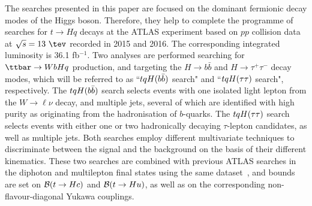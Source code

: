 
The searches presented in this paper are focused on the dominant fermionic decay modes of the Higgs boson.
Therefore, they help to complete the programme of searches for $t \to Hq$ decays at the ATLAS experiment based on $pp$ collision 
data at $\sqrt{s}=13~\tev$ recorded in 2015 and 2016. The corresponding integrated luminosity is 36.1 fb$^{-1}$.
Two analyses are performed searching for $\ttbar \to WbHq$ production, and targeting the $H \to b\bar{b}$ and $H \to \tau^+\tau^-$ decay modes, 
which will be referred to as ``$tqH(b\bar{b})$ search" and ``$tqH(\tau\tau)$ search", respectively.
The $tqH(b\bar{b})$ search selects events with one isolated light lepton from the $W \to \ell\nu$ decay, and multiple jets, several 
of which are identified with high purity as originating from the hadronisation of $b$-quarks. 
The $tqH(\tau\tau)$ search selects events with either one or two hadronically decaying $\tau$-lepton candidates, as well as multiple jets. 
Both searches employ different multivariate techniques to discriminate between the signal and the background on the basis of their different kinematics. 
These two searches are combined with previous ATLAS searches in the diphoton and multilepton final states using the same dataset~\cite{Aaboud:2017mfd,Aaboud:2018pob}, 
and bounds are set on $\mathcal{B}(t\to Hc)$ and $\mathcal{B}(t\to Hu)$, as well as on the corresponding non-flavour-diagonal Yukawa couplings. 






